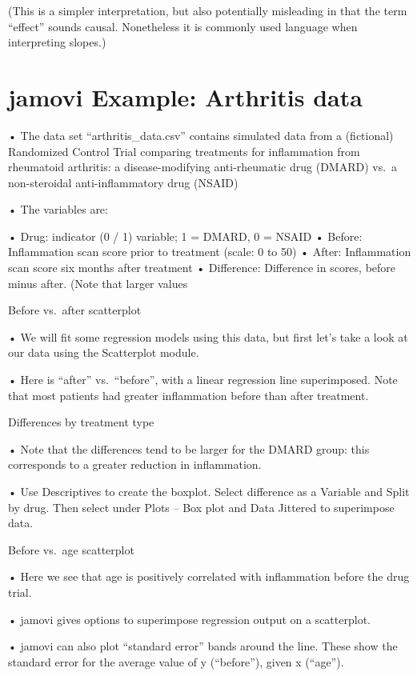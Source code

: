 \documentclass[
  letterpaper,
  DIV=11,
  numbers=noendperiod]{scrreprt}
\begin{document}
(This is a simpler interpretation, but also potentially misleading in
that the term ``effect'' sounds causal. Nonetheless it is commonly used
language when interpreting slopes.)

\hypertarget{jamovi-example-arthritis-data}{%
\section{jamovi Example: Arthritis
data}\label{jamovi-example-arthritis-data}}

• The data set ``arthritis\_data.csv'' contains simulated data from a
(fictional) Randomized Control Trial comparing treatments for
inflammation from rheumatoid arthritis: a disease-modifying
anti-rheumatic drug (DMARD) vs.~a non-steroidal anti-inflammatory drug
(NSAID)

• The variables are:

• Drug: indicator (0 / 1) variable; 1 = DMARD, 0 = NSAID • Before:
Inflammation scan score prior to treatment (scale: 0 to 50) • After:
Inflammation scan score six months after treatment • Difference:
Difference in scores, before minus after. (Note that larger values

Before vs.~after scatterplot

• We will fit some regression models using this data, but first let's
take a look at our data using the Scatterplot module.

• Here is ``after'' vs.~``before'', with a linear regression line
superimposed. Note that most patients had greater inflammation before
than after treatment.

Differences by treatment type

• Note that the differences tend to be larger for the DMARD group: this
corresponds to a greater reduction in inflammation.

• Use Descriptives to create the boxplot. Select difference as a
Variable and Split by drug. Then select under Plots -- Box plot and Data
Jittered to superimpose data.

Before vs.~age scatterplot

• Here we see that age is positively correlated with inflammation before
the drug trial.

• jamovi gives options to superimpose regression output on a
scatterplot.

• jamovi can also plot ``standard error'' bands around the line. These
show the standard error for the average value of y (``before''), given x
(``age'').
\end{document}
